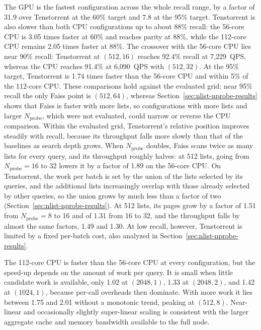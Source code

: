 The GPU is the fastest configuration across the whole recall range, by a
factor of 31.9 over Tenstorrent at the 60\% target and 7.8 at the 95\% target.
Tenstorrent is also slower than both CPU configurations up to about 88\%
recall: the 56-core CPU is 3.05 times faster at 60\% and reaches parity at
88\%, while the 112-core CPU remains 2.05 times faster at 88\%. The crossover
with the 56-core CPU lies near 90\% recall: Tenstorrent at \((512,16)\) reaches
92.4\% recall at 7,229~QPS, whereas the CPU reaches 91.4\% at 6,090~QPS with
\((512,32)\). At the 95\% target, Tenstorrent is 1.74 times faster than the
56-core CPU and within 5\% of the 112-core CPU. These comparisons hold against
the evaluated grid: near 95\% recall the only Faiss point is \((512,64)\),
whereas Section~\ref{sec:nlist-nprobe-results} shows that Faiss is faster with
more lists, so configurations with more lists and larger
\(N_{\mathrm{probe}}\), which were not evaluated, could narrow or reverse the
CPU comparison. Within the evaluated grid, Tenstorrent's relative position
improves steadily with recall, because its throughput falls more
slowly than that of the baselines as search depth grows. When
\(N_{\mathrm{probe}}\) doubles, Faiss scans twice as many lists for every
query, and its throughput roughly halves: at 512 lists, going from
\(N_{\mathrm{probe}}=16\) to 32 lowers it by a factor of 1.89 on the 56-core
CPU. On Tenstorrent, the work per batch is set by the union of the lists
selected by its queries, and the additional lists increasingly overlap with
those already selected by other queries, so the union grows by much less than
a factor of two (Section~\ref{sec:nlist-nprobe-results}). At 512 lists, its
pages grow by a factor of 1.51 from \(N_{\mathrm{probe}}=8\) to 16 and of 1.31
from 16 to 32, and the throughput falls by almost the same factors, 1.49 and
1.30. At low recall, however, Tenstorrent is limited by a fixed per-batch cost,
also analyzed in Section~\ref{sec:nlist-nprobe-results}.

The 112-core CPU is faster than the 56-core CPU at every configuration, but
the speed-up depends on the amount of work per query. It is small when little
candidate work is available, only 1.02 at \((2048,1)\), 1.33 at
\((2048,2)\), and 1.42 at \((1024,1)\), because per-call overheads then
dominate. With more work it
lies between 1.75 and 2.01 without a monotonic trend, peaking at \((512,8)\).
Near-linear and occasionally slightly super-linear scaling is consistent with
the larger aggregate cache and memory bandwidth available to the full node.

